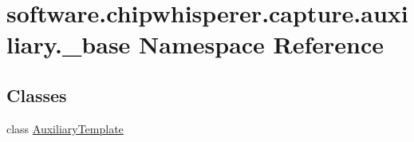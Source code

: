 \hypertarget{namespacesoftware_1_1chipwhisperer_1_1capture_1_1auxiliary_1_1__base}{}\section{software.\+chipwhisperer.\+capture.\+auxiliary.\+\_\+base Namespace Reference}
\label{namespacesoftware_1_1chipwhisperer_1_1capture_1_1auxiliary_1_1__base}
\subsection*{Classes}
\begin{DoxyCompactItemize}
\item 
class \hyperlink{classsoftware_1_1chipwhisperer_1_1capture_1_1auxiliary_1_1__base_1_1AuxiliaryTemplate}{Auxiliary\+Template}
\end{DoxyCompactItemize}
